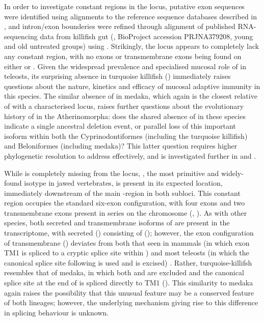 	In order to investigate constant regions in the \nfu \igh{} locus, putative exon sequences were identified using  alignments to the reference sequence databases described in , and intron/exon bounderies were refined through alignment of published RNA-sequencing data from killifish gut (\parencite{smith2017microbiota}, BioProject accession PRJNA379208, young and old untreated groups) using  . Strikingly, the \nfu \igh{} locus appears to completely lack any  constant region, with no \cz{} exons or  transmembrane exons being found on either  or . Given the widespread prevalence and specialised mucosal role of  in teleosts, its surprising absence in turquoise killifish () immediately raises questions about the nature, kinetics and efficacy of mucosal adaptive immunity in this species. The similar absence of  in medaka, which again is the closest relative of \Nfu with a characterised locus, raises further questions about the evolutionary history of  in the Atherinomorpha: does the shared absence of  in these species indicate a single ancestral deletion event, or parallel loss of this important isoform within both the Cyprinodontiformes (including the turquoise killifish) and Beloniformes (including medaka)? This latter question requires higher phylogenetic resolution to address effectively, and is investigated further in  and .
	
	While  is completely missing from the \Nfu \igh{} locus, , the most primitive and widely-found isotype in jawed vertebrates, is present in its expected location, immediately downstream of the main \jh-region in both subloci. This constant region occupies the standard six-exon configuration, with four \cm{} exons and two transmembrane exons present in series on the chromosome (, ). As with other species, both secreted and transmembrane isoforms of  are present in the transcriptome, with secreted  () consisting of  (); however, the exon configuration of transmembrane  () deviates from both that seen in mammals (in which exon TM1 is spliced to a cryptic splice site within ) and most teleosts (in which the canonical splice site following  is used and  is excised) \parencite{fillatreau2013astonishing}. Rather, turquoise-killifsh  resembles that of medaka, in which both  and  are excluded and the canonical splice site at the end of  is spliced directly to TM1 (). This similarity to medaka again raises the possibility that this unusual feature may be a conserved feature of both lineages; however, the underlying mechanism giving rise to this difference in splicing behaviour is unknown.
	
